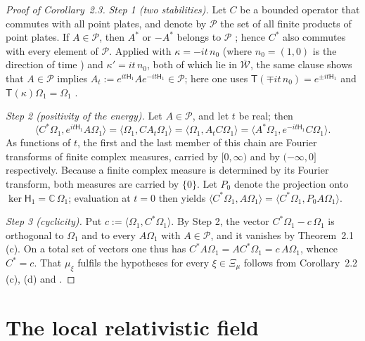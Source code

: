 \documentclass[11pt]{amsart}
\theoremstyle{definition}
\begin{document}
\begin{proof}[Proof of Corollary~2.3]
\emph{Step 1 (two stabilities).}
Let $C$ be a bounded operator that commutes with all point plates, and denote by $\mathcal P$ the set of all finite products of point plates.
If $A\in\mathcal P$, then $A^*$ or $-A^*$ belongs to $\mathcal P$ \cite[Proposition~14.18\,(b)]{QEDII}; hence $C^*$ also commutes with every element of $\mathcal P$.
Applied with $\kappa=-it\,n_0$ (where $n_0=(1,0)$ is the direction of time \cite[Definition~14.5]{QEDII}) and $\kappa'=it\,n_0$, both of which lie in $\overline{\mathcal W}$, the same clause shows that $A\in\mathcal P$ implies $A_t:=e^{it\mathsf H_1}Ae^{-it\mathsf H_1}\in\mathcal P$; here one uses $\mathsf T(\mp it\,n_0)=e^{\pm it\mathsf H_1}$ and $\mathsf T(\kappa)\Omega_1=\Omega_1$ \cite[Lemma~14.17\,(a)]{QEDII}.

\emph{Step 2 (positivity of the energy).}
Let $A\in\mathcal P$, and let $t$ be real; then
\begin{equation*}
\langle C^*\Omega_1,e^{it\mathsf H_1}A\Omega_1\rangle=\langle\Omega_1,CA_t\Omega_1\rangle=\langle\Omega_1,A_tC\Omega_1\rangle=\langle A^*\Omega_1,e^{-it\mathsf H_1}C\Omega_1\rangle.
\end{equation*}
As functions of $t$, the first and the last member of this chain are Fourier transforms of finite complex measures, carried by $[0,\infty)$ and by $(-\infty,0]$ respectively.
Because a finite complex measure is determined by its Fourier transform, both measures are carried by $\{0\}$.
Let $P_0$ denote the projection onto $\ker\mathsf H_1=\mathbb C\,\Omega_1$; evaluation at $t=0$ then yields $\langle C^*\Omega_1,\allowbreak A\Omega_1\rangle=\allowbreak \langle C^*\Omega_1,\allowbreak P_0A\Omega_1\rangle$.

\emph{Step 3 (cyclicity).}
Put $c:=\langle\Omega_1,C^*\Omega_1\rangle$.
By Step 2, the vector $C^*\Omega_1-c\,\Omega_1$ is orthogonal to $\Omega_1$ and to every $A\Omega_1$ with $A\in\mathcal P$, and it vanishes by Theorem~2.1\,(c).
On a total set of vectors one thus has $C^*A\Omega_1=AC^*\Omega_1=c\,A\Omega_1$, whence $C^*=c$.
That $\mu_\xi$ fulfils the hypotheses for every $\xi\in\Xi_\mu$ follows from Corollary~2.2\,(c), (d) and \cite[Theorem~44\,(D3)]{QEDIII}.
\end{proof}


\section{The local relativistic field}
\end{document}
